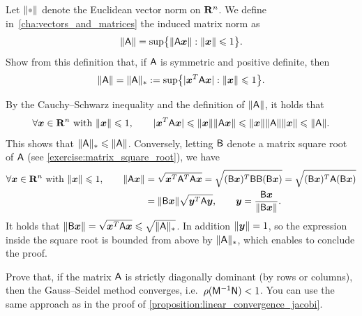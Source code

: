 \begin{exercise}
    Let $\norm{\placeholder}$ denote the Euclidean vector norm on $\mathbf R^n$.
    We define in~\cref{cha:vectors_and_matrices} the induced matrix norm as
    \[
        \lVert\mathsf A\rVert = \sup \bigl\{ \lVert\mathsf A \mathbf{\boldsymbol{x}}\rVert: \lVert\mathbf{\boldsymbol{x}}\rVert \leqslant 1 \bigr\}.
    \]
    Show from this definition that, if $\mathsf A$ is symmetric and positive definite,
    then
    \[
        \lVert\mathsf A\rVert = \lVert\mathsf A\rVert_* := \sup \bigl\{ \lvert\mathbf{\boldsymbol{x}}^T \mathsf A \mathbf{\boldsymbol{x}}\rvert: \lVert\mathbf{\boldsymbol{x}}\rVert \leqslant 1 \bigr\}.
    \]
\end{exercise}
\begin{solution}
    By the Cauchy--Schwarz inequality and the definition of $\lVert\mathsf A\rVert$,
    it holds that
    \[
        \forall \mathbf{\boldsymbol{x}} \in \mathbf R^n \text{ with } \lVert\mathbf{\boldsymbol{x}}\rVert \leqslant 1, \qquad
         \lvert\mathbf{\boldsymbol{x}}^T \mathsf A \mathbf{\boldsymbol{x}}\rvert
         \leqslant \lVert\mathbf{\boldsymbol{x}}\rVert \lVert\mathsf A \mathbf{\boldsymbol{x}}\rVert
         \leqslant \lVert\mathbf{\boldsymbol{x}}\rVert \lVert\mathsf A\rVert \lVert\mathbf{\boldsymbol{x}}\rVert \leqslant \lVert\mathsf A\rVert.
    \]
    This shows that $\lVert\mathsf A\rVert_* \leqslant \lVert\mathsf A\rVert$.
    Conversely,
    letting $\mathsf B$ denote a matrix square root of $\mathsf A$ (see \cref{exercise:matrix_square_root}),
    we have
    \begin{align*}
        \forall \mathbf{\boldsymbol{x}} \in \mathbf R^n \text{ with } \lVert\mathbf{\boldsymbol{x}}\rVert \leqslant 1, \qquad
        \lVert\mathsf A \mathbf{\boldsymbol{x}}\rVert
        &= \sqrt{\mathbf{\boldsymbol{x}}^T \mathsf A^T \mathsf A \mathbf{\boldsymbol{x}}}
        = \sqrt{(\mathsf B\mathbf{\boldsymbol{x}})^T \mathsf B \mathsf B (\mathsf B\mathbf{\boldsymbol{x}})}
        = \sqrt{(\mathsf B\mathbf{\boldsymbol{x}})^T \mathsf A (\mathsf B\mathbf{\boldsymbol{x}})} \\
        &= \lVert\mathsf B \mathbf{\boldsymbol{x}}\rVert \sqrt{\mathbf{\boldsymbol{y}}^T \mathsf A \mathbf{\boldsymbol{y}}},
        \qquad \mathbf{\boldsymbol{y}} = \frac{\mathsf B \mathbf{\boldsymbol{x}}}{\lVert\mathsf B \mathbf{\boldsymbol{x}}\rVert}.
    \end{align*}
    It holds that $\lVert\mathsf B \mathbf{\boldsymbol{x}}\rVert = \sqrt{\mathbf{\boldsymbol{x}}^T \mathsf A \mathbf{\boldsymbol{x}}} \leqslant \sqrt{\lVert\mathsf A\rVert_*}$.
    In addition $\lVert\mathbf{\boldsymbol{y}}\rVert = 1$,
    so the expression inside the square root is bounded from above by $\lVert\mathsf A\rVert_*$,
    which enables to conclude the proof.
\end{solution}


\begin{exercise}
    \label{exercise:linear_convergence_gauss_seidel}
    Prove that, if the matrix $\mathsf A$ is strictly diagonally dominant (by rows or columns),
    then the Gauss--Seidel method converges, i.e.\ $\rho(\mathsf M^{-1} \mathsf N) < 1$.
    You can use the same approach as in the proof of \cref{proposition:linear_convergence_jacobi}.
\end{exercise}

